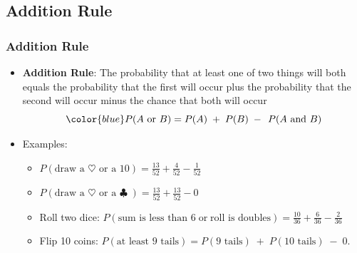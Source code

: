 \documentclass[t]{beamer}
\begin{document}
\subsection{Addition Rule}
\begin{frame}
\frametitle{Addition Rule}
{\small
\begin{itemize}
\item \textbf{Addition Rule}:  The probability that at least one of two 
things will both  equals the probability that the first
will occur plus the probability that the second will occur minus the chance that both will occur
\[\color{blue}P(\mbox{$A$ or $B$}) = P(A) \; + \; P(B) \; - \; \,P(\mbox{$A$ and $B$})\vspace{-4pt}\]
\item Examples:
   \begin{itemize}
   \item \footnotesize $P(\mbox{draw a $\heartsuit$ or a 10}) = \frac{13}{52} + \frac{4}{52} - \frac{1}{52}$\\[5pt]
   \item \footnotesize $P(\mbox{draw a $\heartsuit$ or a $\clubsuit$}\;) = \frac{13}{52} + \frac{13}{52} - 0$\\[5pt]
   \item \footnotesize Roll two dice:  $P(\mbox{sum is less than 6}\; \mbox{or}\; \mbox{roll is doubles}) = 
           \frac{10}{36} + \frac{6}{36} - \frac{2}{36}$\\[5pt]
   \item \footnotesize Flip 10 coins:  $P(\mbox{at least 9 tails}) = P(\mbox{9 tails}) \; + \; P(\mbox{10 tails}) \; - \; 0$.  
   \end{itemize}
\end{itemize}}

\end{frame}
\end{document}
